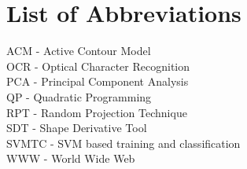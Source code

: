 
\chapter*{List of Abbreviations}
\begin{spacing}{1.5}
ACM - Active Contour Model \\
OCR - Optical Character Recognition \\
PCA - Principal Component Analysis \\
QP - Quadratic Programming \\
RPT - Random Projection Technique \\
SDT - Shape Derivative Tool \\
SVMTC - SVM based training and classification \\
WWW - World Wide Web \\

\end{spacing}
